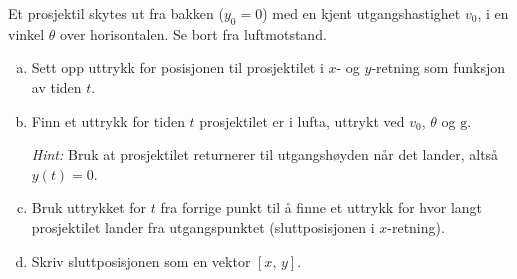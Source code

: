 %
Et prosjektil skytes ut fra bakken ($y_0 = 0$) med en kjent utgangshastighet $v_0$, i en vinkel $\theta$ over horisontalen. Se bort fra luftmotstand.
\begin{enumerate}[a)]
    \item Sett opp uttrykk for posisjonen til prosjektilet i $x$- og $y$-retning som funksjon av tiden $t$.
    \item Finn et uttrykk for tiden $t$ prosjektilet er i lufta, uttrykt ved $v_0$, $\theta$ og $\mathrm{g}$.

    \textit{Hint:} Bruk at prosjektilet returnerer til utgangshøyden når det lander, altså $y(t) = 0$.

    \item Bruk uttrykket for $t$ fra forrige punkt til å finne et uttrykk for hvor langt prosjektilet lander fra utgangspunktet (sluttposisjonen i $x$-retning).
    \item Skriv sluttposisjonen som en vektor $[x,\,y]$.
\end{enumerate}
